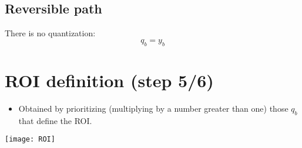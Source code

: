 \subsection*{Reversible path}
There is no quantization:
\begin{equation}
  q_b = y_b
\tag{J2KRanging}
\end{equation}

\section{ROI definition (step 5/6)}
\begin{itemize}
\item Obtained by prioritizing (multiplying by a number greater than
  one) those $q_b$ that define the ROI.
\end{itemize}
\begin{center}
\texttt{[image: ROI]}
\end{center}


